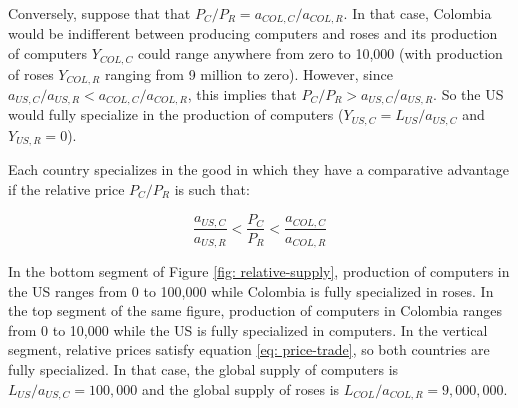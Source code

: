 \documentclass[11pt,letterpaper]{article}
\begin{document}
Conversely, suppose that that $P_C/P_R = a_{COL,C}/ a_{COL,R}$. In that case, Colombia would be indifferent between producing computers and roses and its production of computers $Y_{COL,C}$ could range anywhere from zero to 10,000 (with production of roses $Y_{COL,R}$ ranging from 9 million to zero). However, since $a_{US,C}/ a_{US,R} < a_{COL,C}/a_{COL,R}$, this implies that $P_C/P_R > a_{US,C}/ a_{US,R}$. So the US would fully specialize in the production of computers ($Y_{US,C} = L_{US}/a_{US,C}$ and $Y_{US,R} = 0$).

Each country specializes in the good in which they have a comparative advantage if the relative price $P_C/P_R$ is such that:

\begin{equation}\label{eq: price-trade}
    \frac{a_{US,C}}{a_{US,R}} < \frac{P_C}{P_R} < \frac{a_{COL,C}}{a_{COL,R}}
\end{equation}

In the bottom segment of Figure \ref{fig: relative-supply}, production of computers in the US ranges from 0 to 100,000 while Colombia is fully specialized in roses. In the top segment of the same figure, production of computers in Colombia ranges from 0 to 10,000 while the US is fully specialized in computers. In the vertical segment, relative prices satisfy equation  \eqref{eq: price-trade}, so both countries are fully specialized. In that case, the global supply of computers is $L_{US}/a_{US,C} = 100{,}000$ and the global supply of roses is $L_{COL}/a_{COL,R} = 9{,}000{,}000$.
\end{document}
